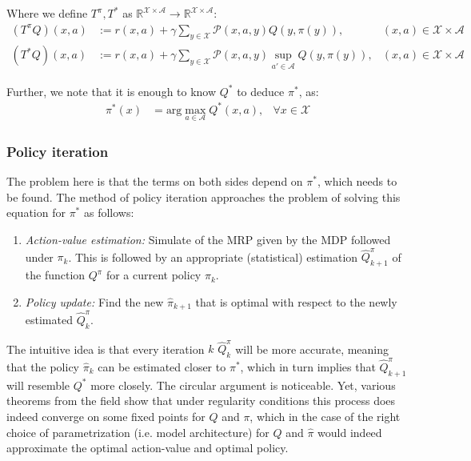 \documentclass{article}
\theoremstyle{definition}
\theoremstyle{remark}
\newcommand{\stat}{\mathcal{X}}
\newcommand{\act}{\mathcal{A}}
\newcommand{\prob}{\mathcal{P}}
\newcommand{\R}{\mathbb{R}}
\begin{document}
Where we define $T^\pi, T^*$ as $\R^{\stat\times \act} \rightarrow \R^{\stat\times \act}$: 
\begin{align}
    (T^\pi Q)(x,a) &:= r(x,a) + \gamma \sum_{y\in \stat} \prob(x,a,y)Q(y,\pi(y)), & (x,a)\in \stat \times \act \\
    (T^* Q)(x,a) &:= r(x,a) + \gamma \sum_{y\in \stat} \prob(x,a,y)\sup_{a'\in \act}Q(y,\pi(y)), & (x,a)\in \stat \times \act
\end{align}

Further, we note that it is enough to know $Q^*$ to deduce $\pi^*$, as:
\begin{align}
    \pi^*(x) &= \text{arg}\max_{a\in \mathcal{A}} Q^* (x,a), &\forall x \in \mathcal{X}
\end{align}

\subsubsection{Policy iteration}
The problem here is that the terms on both sides depend on $\pi^*$, which needs to be found. The method of policy iteration approaches the problem of solving this equation for $\pi^*$ as follows:

\begin{enumerate}
    \item \textit{Action-value estimation:} Simulate of the MRP given by the MDP followed under $\pi_k$. This is followed by an appropriate (statistical) estimation $\hat Q^\pi_{k+1}$ of the function $Q^\pi$ for a current policy $\pi_k$.
    
    \item \textit{Policy update:} Find the new $\hat\pi_{k+1}$ that is optimal with respect to the newly estimated $\hat Q^\pi_k$.
\end{enumerate}

The intuitive idea is that every iteration $k$ $\hat Q^\pi_{k}$ will be more accurate, meaning that the policy $\hat\pi_k$ can be estimated closer to $\pi^*$, which in turn implies that $\hat Q^\pi_{k+1}$ will resemble $Q^*$ more closely. The circular argument is noticeable. Yet, various theorems from the field show that under regularity conditions this process does indeed converge on some fixed points for $Q$ and $\pi$, which in the case of the right choice of parametrization (i.e. model architecture) for $\hat Q$ and $\hat\pi$ would indeed approximate the optimal action-value and optimal policy.

 
\end{document}
